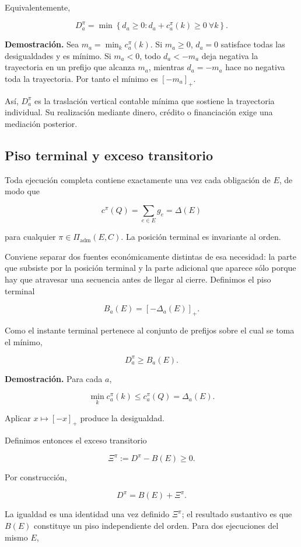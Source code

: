 \documentclass[10pt,a5paper,twoside]{article}
\begin{document}
Equivalentemente,

\[
D^\pi_a
=
\min\left\{
d_a\ge0:
d_a+c^\pi_a(k)\ge0\ \forall k
\right\}.
\]

\textbf{Demostración.} Sea \(m_a=\min_k c^\pi_a(k)\). Si \(m_a\ge0\),
\(d_a=0\) satisface todas las desigualdades y es mínimo. Si \(m_a<0\),
todo \(d_a<-m_a\) deja negativa la trayectoria en un prefijo que alcanza
\(m_a\), mientras \(d_a=-m_a\) hace no negativa toda la trayectoria. Por
tanto el mínimo es \([ -m_a ]_+\).

Así, \(D^\pi_a\) es la traslación vertical contable mínima que sostiene
la trayectoria individual. Su realización mediante dinero, crédito o
financiación exige una mediación posterior.

\subsection{Piso terminal y exceso transitorio}\label{piso-terminal-y-exceso-transitorio}

Toda ejecución completa contiene exactamente una vez cada obligación de
\(E\), de modo que

\[
c^\pi(Q)
=
\sum_{e\in E}g_e
=
\Delta(E)
\]

para cualquier \(\pi\in\Pi_{\mathrm{adm}}(E,C)\). La posición terminal
es invariante al orden.

Conviene separar dos fuentes económicamente distintas de esa necesidad: la parte que
subsiste por la posición terminal y la parte adicional que aparece sólo porque hay que
atravesar una secuencia antes de llegar al cierre.
Definimos el piso terminal

\[
B_a(E)
=
[-\Delta_a(E)]_+.
\]

Como el instante terminal pertenece al conjunto de prefijos sobre el
cual se toma el mínimo,

\[
D^\pi_a\ge B_a(E).
\]

\textbf{Demostración.} Para cada \(a\),

\[
\min_k c^\pi_a(k)
\le
c^\pi_a(Q)
=
\Delta_a(E).
\]

Aplicar \(x\mapsto[-x]_+\) produce la desigualdad.

Definimos entonces el exceso transitorio

\[
\Xi^\pi:=D^\pi-B(E)\ge0.
\]

Por construcción,

\[
D^\pi=B(E)+\Xi^\pi.
\]

La igualdad es una identidad una vez definido \(\Xi^\pi\); el resultado
sustantivo es que \(B(E)\) constituye un piso independiente del orden. Para dos ejecuciones del mismo \(E\),
\end{document}
